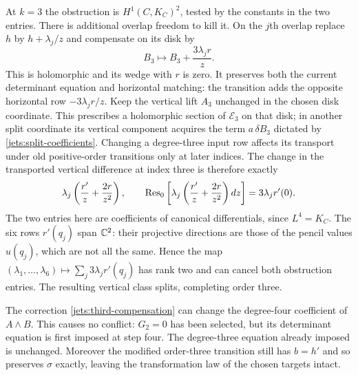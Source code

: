At $k=3$ the obstruction is $H^1(C,K_C)^2$, tested by the constants
in the two entries.  There is additional overlap freedom to kill it.
On the $j$th overlap replace $h$ by $h+\lambda_j/z$ and compensate
on its disk by
\begin{equation}\label{jets:third-compensation}
 B_3\longmapsto B_3+\frac{3\lambda_jr}{z}.
\end{equation}
This is holomorphic and its wedge with $r$ is zero.  It preserves
both the current determinant equation and horizontal matching:
the transition adds the opposite horizontal row $-3\lambda_jr/z$.
Keep the vertical lift $A_3$ unchanged in the chosen disk coordinate.
This prescribes a holomorphic section of $\mathcal E_3$ on that disk;
in another split coordinate its vertical component acquires the term
$a\,\delta B_3$ dictated by \eqref{jets:split-coefficients}.
Changing a degree-three input row affects its transport under old
positive-order transitions only at later indices.
The change in the transported vertical difference at index three is
therefore exactly
\begin{equation}\label{jets:third-residue}
 \lambda_j\left(\frac{r'}z+\frac{2r}{z^2}\right),\qquad
 \operatorname{Res}_0\left[\lambda_j\left(\frac{r'}z+\frac{2r}{z^2}\right)dz\right]
       =3\lambda_jr'(0).
\end{equation}
The two entries here are coefficients of canonical differentials,
since $L^4=K_C$.  The six rows $r'(q_j)$ span $\mathbb C^2$: their
projective directions are those of the pencil values $u(q_j)$, which
are not all the same.  Hence the map
$(\lambda_1,\ldots,\lambda_6)\mapsto\sum_j3\lambda_jr'(q_j)$
has rank two and can cancel both obstruction entries.
The resulting vertical class splits, completing order three.

The correction \eqref{jets:third-compensation} can change the
degree-four coefficient of $A\wedge B$.  This causes no conflict:
$G_2=0$ has been selected, but its determinant equation is first
imposed at step four.  The degree-three equation already imposed is
unchanged.  Moreover the modified order-three transition still has
$b=h'$ and so preserves $\sigma$ exactly, leaving the transformation
law of the chosen targets intact.

